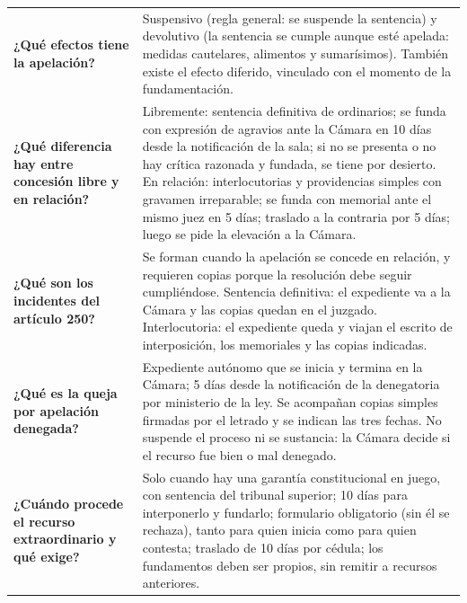 \documentclass[12pt,oneside]{book}
\begin{document}
\begin{longtable}{
    >{\raggedright\arraybackslash}p{}
    >{\raggedright\arraybackslash}p{}
}
\textbf{¿Qu\'e efectos tiene la apelaci\'on?} &
Suspensivo (regla general: se suspende la sentencia) y devolutivo (la sentencia se cumple aunque est\'e apelada: medidas cautelares, alimentos y sumar\'isimos). Tambi\'en existe el efecto diferido, vinculado con el momento de la fundamentaci\'on. \\[0.6em]

\textbf{¿Qu\'e diferencia hay entre concesi\'on libre y en relaci\'on?} &
Libremente: sentencia definitiva de ordinarios; se funda con expresi\'on de agravios ante la C\'amara en 10 d\'ias desde la notificaci\'on de la sala; si no se presenta o no hay cr\'itica razonada y fundada, se tiene por desierto. En relaci\'on: interlocutorias y providencias simples con gravamen irreparable; se funda con memorial ante el mismo juez en 5 d\'ias; traslado a la contraria por 5 d\'ias; luego se pide la elevaci\'on a la C\'amara. \\[0.6em]

\textbf{¿Qu\'e son los incidentes del art\'iculo 250?} &
Se forman cuando la apelaci\'on se concede en relaci\'on, y requieren copias porque la resoluci\'on debe seguir cumpli\'endose. Sentencia definitiva: el expediente va a la C\'amara y las copias quedan en el juzgado. Interlocutoria: el expediente queda y viajan el escrito de interposici\'on, los memoriales y las copias indicadas. \\[0.6em]

\textbf{¿Qu\'e es la queja por apelaci\'on denegada?} &
Expediente aut\'onomo que se inicia y termina en la C\'amara; 5 d\'ias desde la notificaci\'on de la denegatoria por ministerio de la ley. Se acompa\~nan copias simples firmadas por el letrado y se indican las tres fechas. No suspende el proceso ni se sustancia: la C\'amara decide si el recurso fue bien o mal denegado. \\[0.6em]

\textbf{¿Cu\'ando procede el recurso extraordinario y qu\'e exige?} &
Solo cuando hay una garant\'ia constitucional en juego, con sentencia del tribunal superior; 10 d\'ias para interponerlo y fundarlo; formulario obligatorio (sin \'el se rechaza), tanto para quien inicia como para quien contesta; traslado de 10 d\'ias por c\'edula; los fundamentos deben ser propios, sin remitir a recursos anteriores. \\


\end{longtable}
\end{document}
